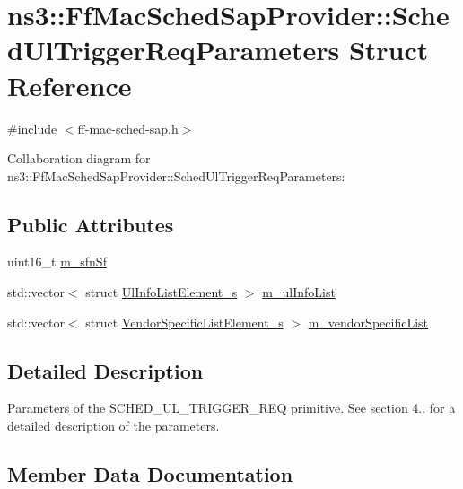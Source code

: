 \hypertarget{structns3_1_1FfMacSchedSapProvider_1_1SchedUlTriggerReqParameters}{}\section{ns3\+:\+:Ff\+Mac\+Sched\+Sap\+Provider\+:\+:Sched\+Ul\+Trigger\+Req\+Parameters Struct Reference}
\label{structns3_1_1FfMacSchedSapProvider_1_1SchedUlTriggerReqParameters}


{\ttfamily \#include $<$ff-\/mac-\/sched-\/sap.\+h$>$}



Collaboration diagram for ns3\+:\+:Ff\+Mac\+Sched\+Sap\+Provider\+:\+:Sched\+Ul\+Trigger\+Req\+Parameters\+:
\subsection*{Public Attributes}
\begin{DoxyCompactItemize}
\item 
uint16\+\_\+t \hyperlink{structns3_1_1FfMacSchedSapProvider_1_1SchedUlTriggerReqParameters_a119a46d1e31202dd95df83c0c8eb35ac}{m\+\_\+sfn\+Sf}
\item 
std\+::vector$<$ struct \hyperlink{structns3_1_1UlInfoListElement__s}{Ul\+Info\+List\+Element\+\_\+s} $>$ \hyperlink{structns3_1_1FfMacSchedSapProvider_1_1SchedUlTriggerReqParameters_a13dd97c0be9caa43a95c8e86752f1f2d}{m\+\_\+ul\+Info\+List}
\item 
std\+::vector$<$ struct \hyperlink{structns3_1_1VendorSpecificListElement__s}{Vendor\+Specific\+List\+Element\+\_\+s} $>$ \hyperlink{structns3_1_1FfMacSchedSapProvider_1_1SchedUlTriggerReqParameters_a787df6defa094ff4e2e9c3b28ddd42f0}{m\+\_\+vendor\+Specific\+List}
\end{DoxyCompactItemize}


\subsection{Detailed Description}
Parameters of the S\+C\+H\+E\+D\+\_\+\+U\+L\+\_\+\+T\+R\+I\+G\+G\+E\+R\+\_\+\+R\+EQ primitive. See section 4.. for a detailed description of the parameters. 

\subsection{Member Data Documentation}
